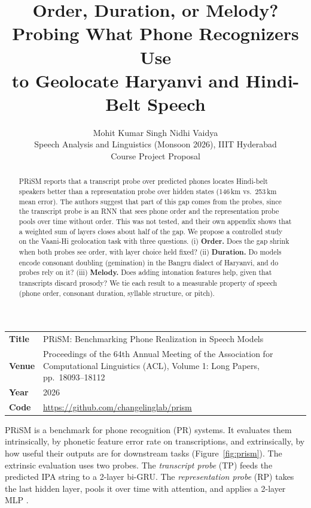 \documentclass[11pt]{article}
\title{Order, Duration, or Melody? Probing What Phone Recognizers Use\\to Geolocate Haryanvi and Hindi-Belt Speech}
\author{Mohit Kumar Singh \qquad\qquad Nidhi Vaidya \\
  Speech Analysis and Linguistics (Monsoon 2026), IIIT Hyderabad \\
  Course Project Proposal}
\makeatletter
\renewcommand\section{\@startsection{section}{1}{\z@}{-1.6ex plus -0.5ex minus -.2ex}{0.8ex plus .2ex}{\large\bfseries\raggedright}}
\makeatother
\begin{document}
\maketitle

\begin{abstract}
PRiSM \citep{bharadwaj2026prism} reports that a transcript probe over predicted phones locates Hindi-belt speakers better than a representation probe over hidden states (146\,km vs.\ 253\,km mean error). The authors suggest that part of this gap comes from the probes, since the transcript probe is an RNN that sees phone order and the representation probe pools over time without order. This was not tested, and their own appendix shows that a weighted sum of layers closes about half of the gap. We propose a controlled study on the Vaani-Hi geolocation task with three questions. (i) \textbf{Order.} Does the gap shrink when both probes see order, with layer choice held fixed? (ii) \textbf{Duration.} Do models encode consonant doubling (gemination) in the Bangru dialect of Haryanvi, and do probes rely on it? (iii) \textbf{Melody.} Does adding intonation features help, given that transcripts discard prosody? We tie each result to a measurable property of speech (phone order, consonant duration, syllable structure, or pitch).
\end{abstract}

\section{Base Paper}
\label{sec:base}

\begin{center}
\small
\begin{tabularx}{\columnwidth}{@{}lX@{}}
\toprule
\textbf{Title} & PRiSM: Benchmarking Phone Realization in Speech Models \\
\textbf{Venue} & Proceedings of the 64th Annual Meeting of the Association for Computational Linguistics (ACL), Volume 1: Long Papers, pp.\ 18093--18112 \\
\textbf{Year} & 2026 \\
\textbf{Code} & \url{https://github.com/changelinglab/prism} \\
\bottomrule
\end{tabularx}
\end{center}

PRiSM is a benchmark for phone recognition (PR) systems. It evaluates them intrinsically, by phonetic feature error rate on transcriptions, and extrinsically, by how useful their outputs are for downstream tasks (Figure~\ref{fig:prism}). The extrinsic evaluation uses two probes. The \emph{transcript probe} (TP) feeds the predicted IPA string to a 2-layer bi-GRU. The \emph{representation probe} (RP) takes the last hidden layer, pools it over time with attention, and applies a 2-layer MLP \citep{turian2022hear}.
\end{document}
